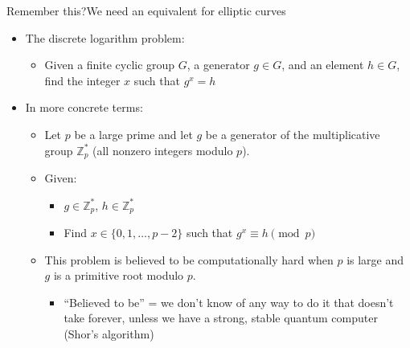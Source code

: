 \documentclass[aspectratio=169, lualatex, handout]{beamer}
\begin{document}
\begin{frame}{Remember this?}{We need an equivalent for elliptic curves}
	\begin{itemize}
		\item The discrete logarithm problem:
		      \begin{itemize}
			      \item Given a finite cyclic group $G$, a generator $g \in G$, and an element
			            $h \in G$, find the integer $x$ such that $g^{x}=h$
		      \end{itemize}
		\item In more concrete terms:
		      \begin{itemize}
			      \item Let $p$ be a large prime and let $g$ be a generator of the multiplicative
			            group $\mathbb{Z}_{p}^{*}$ (all nonzero integers modulo $p$).
			      \item Given:
			            \begin{itemize}
				            \item $g \in \mathbb{Z}_{p}^{*}$, $h \in \mathbb{Z}_{p}^{*}$

				            \item Find $x \in \{0, 1, \ldots, p-2\}$ such that $g^{x} \equiv h \pmod
					                  {p}$
			            \end{itemize}
			      \item This problem is believed to be computationally hard when $p$ is large
			            and $g$ is a primitive root modulo $p$.
			            \begin{itemize}
				            \item ``Believed to be'' = we don't know of any way to do it that doesn't
				                  take forever, unless we have a strong, stable quantum computer (Shor's
				                  algorithm)
			            \end{itemize}
		      \end{itemize}
	\end{itemize}
\end{frame}
\end{document}

